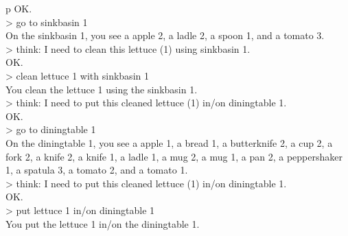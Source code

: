 \begin{table}[H]
\begin{minipage}{0.9\linewidth}
\begin{tabular}{p\linewidth}
OK.\\
> go to sinkbasin 1\\
On the sinkbasin 1, you see a apple 2, a ladle 2, a spoon 1, and a tomato 3.\\
> think: I need to clean this lettuce (1) using sinkbasin 1.\\
OK.\\
> clean lettuce 1 with sinkbasin 1\\
You clean the lettuce 1 using the sinkbasin 1.\\
> think: I need to put this cleaned lettuce (1) in/on diningtable 1.\\
OK.\\
> go to diningtable 1\\
On the diningtable 1, you see a apple 1, a bread 1, a butterknife 2, a cup 2, a fork 2, a knife 2, a knife 1, a ladle 1, a mug 2, a mug 1, a pan 2, a peppershaker 1, a spatula 3, a tomato 2, and a tomato 1.\\
> think: I need to put this cleaned lettuce (1) in/on diningtable 1.\\
OK.\\
> put lettuce 1 in/on diningtable 1\\
You put the lettuce 1 in/on the diningtable 1.\\
\midrule 

\end{tabular}
\end{minipage}%
\end{table}